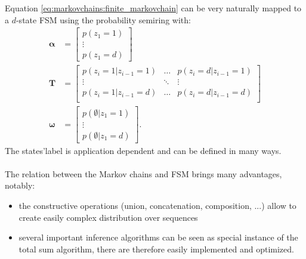 Equation \ref{eq:markovchains:finite_markovchain} can be very
naturally mapped to a $d$-state FSM using the probability semiring with:
\begin{align}
    \boldsymbol{\alpha} &= \begin{bmatrix}
        p(z_1 = 1) \\
        \vdots \\
        p(z_1 = d)
    \end{bmatrix} \\
    \mathbf{T} &= \begin{bmatrix}
        p(z_i = 1 | z_{i-1} = 1)  & \dots & p(z_i = d | z_{i-1} = 1) \\
        \vdots  & \ddots & \vdots \\
        p(z_i = 1 | z_{i-1} = d)  & \dots & p(z_i = d | z_{i-1} = d) \\
    \end{bmatrix} \\
    \boldsymbol{\omega} &= \begin{bmatrix}
        p(\emptyset | z_1 = 1) \\
        \vdots \\
        p(\emptyset | z_1 = d)
    \end{bmatrix}.
\end{align}
The states'label is application dependent and can be defined in many
ways.

\paragraph{} The relation between the Markov chains and FSM brings many
advantages, notably:
\begin{itemize}
    \item the constructive operations (union, concatenation,
        composition, ...) allow to create easily complex distribution
        over sequences
    \item several important inference algorithms can be seen as special
        instance of the total sum algorithm, there are therefore easily
        implemented and optimized.
\end{itemize}

%

